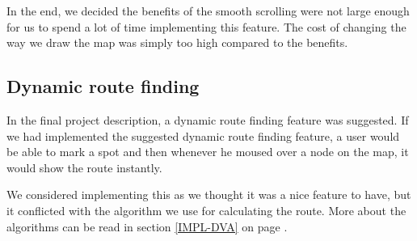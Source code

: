 In the end, we decided the benefits of the smooth scrolling were not large enough
for us to spend a lot of time implementing this feature. The cost of changing
the way we draw the map was simply too high compared to the benefits.

\subsection{Dynamic route finding}
\label{UIA-NI-DRF}
In the final project description, a dynamic route finding feature was
suggested. If we had implemented the suggested dynamic route finding feature, a
user would be able to mark a spot and then whenever he moused over a node on the
map, it would show the route instantly.

We considered implementing this as we thought it was a
nice feature to have, but it conflicted with the algorithm we use for
calculating the route. More about the algorithms can be read in section
\ref{IMPL-DVA}  on page \pageref{IMPL-DVA}.
